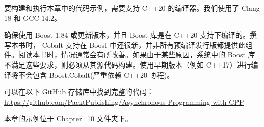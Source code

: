 要构建和执行本章中的代码示例，需要支持 C++20 的编译器。我们使用了 Clang 18 和 GCC 14.2。

确保使用 Boost 1.84 或更新版本，并且 Boost 库是在 C++20 支持下编译的。撰写本书时， Cobalt 支持在 Boost 中还很新，并非所有预编译发行版都提供此组件。阅读本书时，情况通常会有所改善。如果由于某些原因，系统中的 Boost 库不满足这些要求，则必须从其源代码构建。使用早期版本（例如 C++17）进行编译将不会包含 Boost.Cobalt(严重依赖 C++20 协程)。

可以在以下 GitHub 存储库中找到完整的代码：
\url{https://github.com/PacktPublishing/Asynchronous-Programming-with-CPP}

本章的示例位于 Chapter\_10 文件夹下。